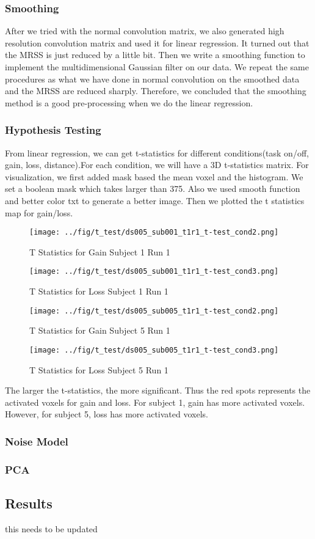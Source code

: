 \subsubsection {Smoothing}
After we tried with the normal convolution matrix, we also generated high resolution convolution matrix and used it for linear regression. It turned out that the MRSS is just reduced by a little bit. Then we write a smoothing function to implement the multidimensional Gaussian filter on our data. We repeat the same procedures as what we have done in normal convolution on the smoothed data and the MRSS are reduced sharply. Therefore, we concluded that the smoothing method is a good pre-processing when we do the linear regression. 

\subsubsection {Hypothesis Testing}
From linear regression, we can get t-statistics for different conditions(task on/off, gain, loss, distance).For each condition, we will have a 3D t-statistics matrix. For visualization, we first added mask based the mean voxel and the histogram. We set a boolean mask which takes larger than 375. Also we used smooth function and better color txt to generate a better image. Then we plotted the t statistics map for gain/loss. 
\begin{figure}[H] 
\centering \texttt{[image: ../fig/t\_test/ds005\_sub001\_t1r1\_t-test\_cond2.png]}	 
\caption{T Statistics for Gain Subject 1 Run 1}
\end{figure} 
\begin{figure}[H] 
\centering 
\texttt{[image: ../fig/t\_test/ds005\_sub001\_t1r1\_t-test\_cond3.png]} 
\caption{T Statistics for Loss Subject 1 Run 1}
\end{figure}
\begin{figure}[H] 
\centering 
\texttt{[image: ../fig/t\_test/ds005\_sub005\_t1r1\_t-test\_cond2.png]}	 
\caption{T Statistics for Gain Subject 5 Run 1}
\end{figure} 
\begin{figure}[H] 
\centering 
\texttt{[image: ../fig/t\_test/ds005\_sub005\_t1r1\_t-test\_cond3.png]} 
\caption{T Statistics for Loss Subject 5 Run 1}
\end{figure}  
\noindent
The larger the t-statistics, the more significant. Thus the red spots represents the activated voxels for gain and loss. For subject 1, gain has more activated voxels. However, for subject 5, loss has more activated voxels.

\subsubsection {Noise Model}

\subsubsection {PCA}

\subsection {Results}
this needs to be updated





